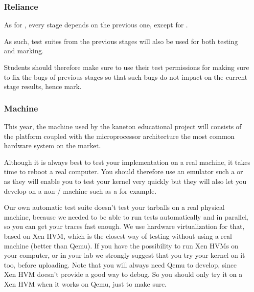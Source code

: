 
\begin{frame}
  \frametitle{Reliance}

  As for , every stage depends on the previous one, except
  for .

  \-

  As such, test suites from the previous stages will also be used for both
  testing and marking.

  \-

  Students should therefore make sure to use their test permissions for making
  sure to fix the bugs of previous stages so that such bugs do not impact
  on the current stage results, hence mark.
\end{frame}


\begin{frame}
  \frametitle{Machine}

  This year, the machine used by the kaneton educational project will consists
  of the  platform coupled with the  microprocessor
  architecture \ie{} the most common hardware system on the market.

  \-

  Although it is always best to test your implementation on a real machine,
  it takes time to reboot a real computer. You should therefore use an
  emulator such a  or  as they will enable you to
  test your kernel very quickly but they will also let you develop on
  a non-/ machine such as a  for example.

  \-

  Our own automatic test suite doesn't test your tarballs on a real physical
  machine, because we needed to be able to run tests automatically and in
  parallel, so you can get your traces fast enough.
  We use hardware virtualization for that, based on Xen HVM, which is the
  closest way of testing without using a real machine (better than Qemu).
  If you have the possibility to run Xen HVMs on your computer, or in your lab
  we strongly suggest that you try your kernel on it too, before uploading.
  Note that you will always need Qemu to develop, since Xen HVM doesn't provide
  a good way to debug. So you should only try it on a Xen HVM when it works on
  Qemu, just to make sure.

\end{frame}


